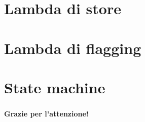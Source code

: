 \documentclass{beamer}
\begin{document}
\section{Lambda di store}
\begin{frame}

\end{frame}

\section{Lambda di flagging}
\begin{frame}

    
\end{frame}

\section{State machine}
\begin{frame}

\end{frame}

\begin{frame}
    \frametitle{}
    
    \fontsize{30pt}{10pt}\selectfont
    \centering
    \textbf{Grazie per l'attenzione!}
    
\end{frame}
\end{document}
